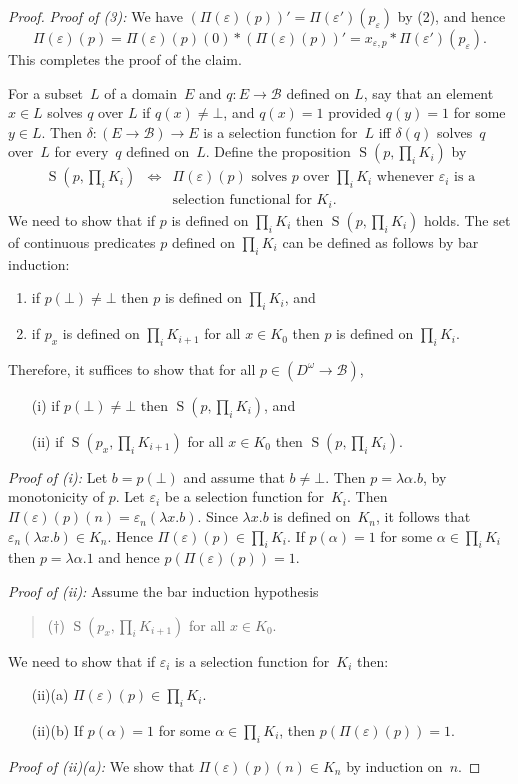 \documentclass{LMCS}
\newcommand{\e}{\varepsilon}
\newcommand{\pBool}{\mathcal{B}}
\newcommand{\True}{1}\newcommand{\False}{0}\newcommand{\domain}[1]{{\D_{#1}}}
\newcommand{\D}{D}
\begin{document}
\begin{proof}
\noindent
\emph{Proof of (3):} We have $(\Pi(\e)(p))' = \Pi(\e')(p_\e)$ by (2),
and hence
\[ \Pi(\e)(p) = \Pi(\e)(p)(0) * (\Pi(\e)(p))' = x_{\e,p} *
\Pi(\e')(p_\e).\]
This completes the proof of the claim.

\newcommand{\Solve}{\operatorname{S}} For a subset~$L$ of a domain~$E$
and $q \colon E \to \pBool$ defined on $L$, say that an element $x \in
L$ solves $q$ over $L$ if $q(x) \ne \bot$, and $q(x)=\True$ provided
$q(y) = \True$ for some $y \in L$.  Then $\delta \colon (E \to \pBool)
\to E$ is a selection function for~$L$ iff $\delta(q)$ solves~$q$
over~$L$ for every~$q$ defined on~$L$.  Define the proposition
$\Solve(p,\prod_i K_i)$ by
\begin{eqnarray*}
  \Solve(p,\prod_i K_i) & \iff & \textstyle{\text{$\Pi(\e)(p)$ solves $p$ over $\prod_i
  K_i$ whenever $\e_i$ is a}} \\[-1.5ex]
& & \text{selection functional for~$K_i$.}
\end{eqnarray*}
We need to show that if $p$ is defined on $\prod_i K_i$ then
$\Solve(p,\prod_i K_i)$ holds.  The set of continuous predicates $p$
defined on $\prod_i K_i$ can be defined as follows by bar induction:
\begin{enumerate}
\item if $p(\bot) \ne \bot$ then $p$ is defined on $\prod_i K_i$, and
\item if $p_x$ is defined on $\prod_i K_{i+1}$ for all $x \in K_0$ then
$p$ is defined on $\prod_i K_i$.
\end{enumerate}
Therefore, it suffices to show that for all $p \in (D^\omega \to \pBool)$,
\begin{enumerate}
\item[(i)] if $p(\bot) \ne \bot$ then $\Solve(p,\prod_i K_i)$, and
\item[(ii)] if $\Solve(p_x,\prod_i K_{i+1})$ for all $x \in K_0$ then $\Solve(p,\prod_i K_i)$.
\end{enumerate}
\noindent\emph{Proof of (i):} Let $b=p(\bot)$ and assume that $b \ne\bot$.  Then $p =
\lambda \alpha.b$, by monotonicity of $p$. Let $\e_i$ be a selection
function for~$K_i$. Then $\Pi(\e)(p)(n) = \e_n (\lambda x.b)$.  Since
$\lambda x.b$ is defined on~$K_n$, it follows that $\e_n (\lambda x.b) \in K_n$. Hence $\Pi(\e)(p) \in
\prod_i K_i$. If $p(\alpha) = \True$ for some $\alpha \in \prod_i K_i$
then $p = \lambda \alpha.\True$ and hence $p(\Pi(\e)(p)) = \True$.

\medskip
\noindent
\emph{Proof of (ii):} Assume the bar induction hypothesis
\begin{quote}
($\dagger$)  $\Solve(p_x,\prod_i K_{i+1})$ for all $x \in K_0$.
\end{quote}
We need to show that if $\e_i$ is a selection function for~$K_i$ then:
\begin{enumerate}  
\item[(ii)(a)] $\Pi(\e)(p)  \in  \prod_i K_i$.
\item[(ii)(b)] If $p(\alpha) = \True$ for some $\alpha \in \prod_i K_i$, then $p(\Pi(\e)(p)) = \True$.
\end{enumerate}
\noindent
\emph{Proof of (ii)(a):} We show that $\Pi(\e)(p)(n) \in K_n$ by
induction on~$n$.


\end{proof}
\end{document}
